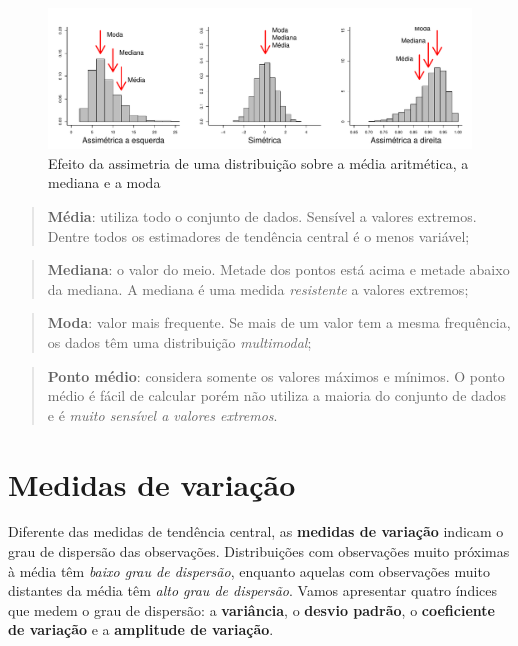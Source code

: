 \documentclass[
]{book}
\begin{document}
\begin{figure}

{\centering \includegraphics{probest-cambientais_files/figure-latex/assimetr-1} 

}

\caption{Efeito da assimetria de uma distribuição sobre a média aritmética, a mediana e a moda}\label{fig:assimetr}
\end{figure}

\begin{quote}
\textbf{Média}: utiliza todo o conjunto de dados. Sensível a valores extremos. Dentre todos os estimadores de tendência central é o menos variável;
\end{quote}

\begin{quote}
\textbf{Mediana}: o valor do meio. Metade dos pontos está acima e metade abaixo da mediana. A mediana é uma medida \emph{resistente} a valores extremos;
\end{quote}

\begin{quote}
\textbf{Moda}: valor mais frequente. Se mais de um valor tem a mesma frequência, os dados têm uma distribuição \emph{multimodal};
\end{quote}

\begin{quote}
\textbf{Ponto médio}: considera somente os valores máximos e mínimos. O ponto médio é fácil de calcular porém não utiliza a maioria do conjunto de dados e é \emph{muito sensível a valores extremos}.
\end{quote}

\hypertarget{medidas-de-variauxe7uxe3o}{%
\section{Medidas de variação}\label{medidas-de-variauxe7uxe3o}}

Diferente das medidas de tendência central, as \textbf{medidas de variação} indicam o grau de dispersão das observações. Distribuições com observações muito próximas à média têm \emph{baixo grau de dispersão}, enquanto aquelas com observações muito distantes da média têm \emph{alto grau de dispersão}. Vamos apresentar quatro índices que medem o grau de dispersão: a \textbf{variância}, o \textbf{desvio padrão}, o \textbf{coeficiente de variação} e a \textbf{amplitude de variação}.
\end{document}

